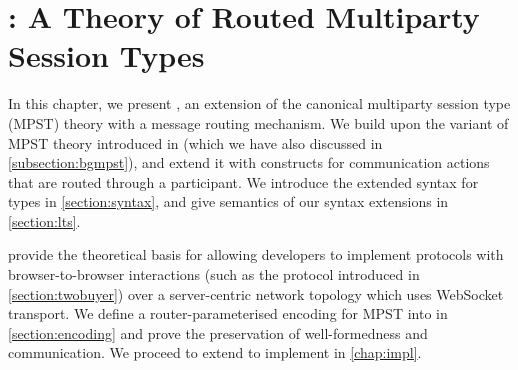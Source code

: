 \chapter{\newtheory: A Theory of
Routed Multiparty Session Types}
\label{chap:theory}

In this chapter, we present
\newtheory, an extension of the
canonical multiparty session type (MPST)
theory with a message routing mechanism.
We build upon the variant of MPST theory introduced
in \cite{LessIsMore}
(which we have also discussed in \cref{subsection:bgmpst}), 
and extend it
with constructs for communication actions
that are routed through a participant.
We introduce the extended syntax for types in 
\cref{section:syntax}, and give semantics of our
syntax extensions in \cref{section:lts}.

\newtheory provide the theoretical basis
for allowing developers to implement
protocols with browser-to-browser interactions
(such as the  protocol
introduced in \cref{section:twobuyer})
over a server-centric network topology
which uses WebSocket transport.
We define a router-parameterised encoding
for MPST into \newtheory in \cref{section:encoding}
and prove the preservation of well-formedness
and communication.
We proceed to extend \codegen to implement \newtheory
in \cref{chap:impl}.






